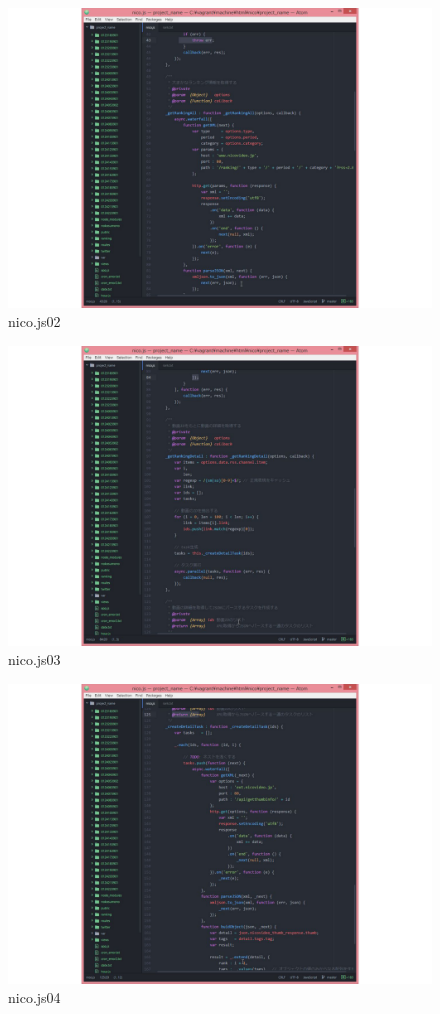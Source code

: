 	\begin{figure}[h]
		\centering
		\includegraphics[width=14cm]{nico02.pdf}
		\caption{nico.js02}\label{ace}
	\end{figure}


	\begin{figure}[h]
		\centering
		\includegraphics[width=14cm]{nico03.pdf}
		\caption{nico.js03}\label{ace}
	\end{figure}

	\begin{figure}[h]
		\centering
		\includegraphics[width=14cm]{nico04.pdf}
		\caption{nico.js04}\label{ace}
	\end{figure}

